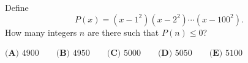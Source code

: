 Define
\[P(x)=\left(x-1^2\right)\left(x-2^2\right)\cdots\left(x-100^2\right).\]
How many integers $n$ are there such that $P(n)\le0$?

$\textbf{(A) }4900\qquad\textbf{(B) }4950\qquad\textbf{(C) }5000\qquad\textbf{(D) }5050\qquad\textbf{(E) }5100$
